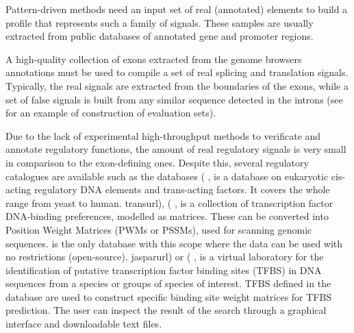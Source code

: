 
Pattern-driven methods need an input set of real (annotated) elements to build a profile that
represents such a family of signals. These samples are usually extracted from public databases 
of annotated gene and promoter regions.

A high-quality collection of exons extracted from the genome browsers annotations must be used to 
compile a set of real splicing and translation signals. Typically, the real signals are extracted 
from the boundaries of the exons, while a set of false signals is built from any similar sequence 
detected in the introns (see \citet{burset:1996a,rogic:2001a} for an example of construction of 
evaluation sets).

Due to the lack of experimental high-throughput methods to verificate and annotate regulatory
functions, the amount of real regulatory signals is very small in comparison to the exon-defining ones.
Despite this, several regulatory catalogues are available such as the databases 
(\citealp{matys:2003a}  , 
    {}
    {%
	   is a database on eukaryotic cis-acting regulatory DNA elements and trans-acting factors. 
	  It covers the whole range from yeast to human.
    }%
    {transurl}),
(\citealp{sandelin:2004a}  , 
    {}
    {%
	   is a collection of transcription factor DNA-binding preferences, modelled as matrices. 
	  These can be converted into Position Weight Matrices (PWMs or PSSMs), used for scanning genomic sequences.
	   is the only database with this scope where the data can be used with no restrictions (open-source).
    }%
    {jasparurl})
or  (\citealp{farre:2003a} , 
    {}
    {%
	   is a virtual laboratory for the identification of putative transcription factor binding sites (TFBS) 
	  in DNA sequences from a species or groups of species of interest. TFBS defined in the  database are 
	  used to construct specific binding site weight matrices for TFBS prediction. The user can inspect the result 
	  of the search through a graphical interface and downloadable text files.
    }%
